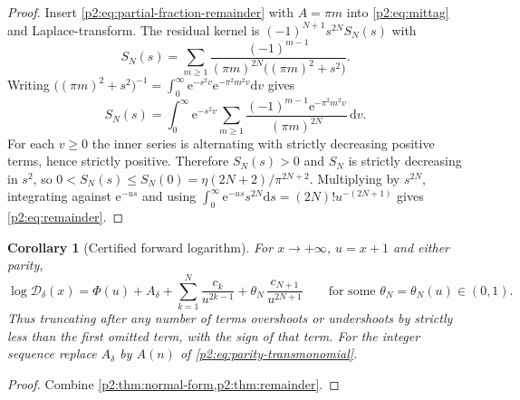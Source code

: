 \documentclass[11pt,a4paper,oneside]{book}
\theoremstyle{plain}
\newtheorem{corollary}[theorem]{Corollary}
\theoremstyle{definition}
\theoremstyle{remark}
\newcommand{\e}{\mathrm{e}}
\newcommand{\dd}{\mathrm{d}}
\begin{document}
\begin{proof}
Insert \cref{p2:eq:partial-fraction-remainder} with \(A=\pi m\) into
\cref{p2:eq:mittag} and Laplace-transform.  The residual kernel is
\((-1)^{N+1}s^{2N}S_N(s)\) with
\[
 S_N(s)=\sum_{m\ge1}\frac{(-1)^{m-1}}
 {(\pi m)^{2N}\bigl((\pi m)^2+s^2\bigr)} .
\]
Writing \(\bigl((\pi m)^2+s^2\bigr)^{-1}=\int_0^\infty
\e^{-s^2v}\e^{-\pi^2m^2v}\dd v\) gives
\[
 S_N(s)=\int_0^\infty\e^{-s^2v}
 \sum_{m\ge1}\frac{(-1)^{m-1}\e^{-\pi^2m^2v}}{(\pi m)^{2N}}\,\dd v .
\]
For each \(v\ge0\) the inner series is alternating with strictly decreasing
positive terms, hence strictly positive.  Therefore \(S_N(s)>0\) and
\(S_N\) is strictly decreasing in \(s^2\), so
\(0<S_N(s)\le S_N(0)=\eta(2N+2)/\pi^{2N+2}\).  Multiplying by
\(s^{2N}\), integrating against \(\e^{-us}\) and using
\(\int_0^\infty\e^{-us}s^{2N}\dd s=(2N)!u^{-(2N+1)}\) gives
\cref{p2:eq:remainder}.
\end{proof}

\begin{corollary}[Certified forward logarithm]
\label{p2:cor:forward-log}
For \(x\to+\infty\), \(u=x+1\) and either parity,
\begin{equation}
 \log\mathcal D_\delta(x)
 =\Phi(u)+A_\delta+\sum_{k=1}^N\frac{c_k}{u^{2k-1}}
  +\theta_N\,\frac{c_{N+1}}{u^{2N+1}}
 \qquad\text{for some }\theta_N=\theta_N(u)\in(0,1).
 \label{p2:eq:forward-certified}
\end{equation}
Thus truncating after any number of terms overshoots or undershoots by
strictly less than the first omitted term, with the sign of that term.  For the
integer sequence replace \(A_\delta\) by \(A(n)\) of
\cref{p2:eq:parity-transmonomial}.
\end{corollary}

\begin{proof}
Combine \cref{p2:thm:normal-form,p2:thm:remainder}.
\end{proof}
\end{document}
